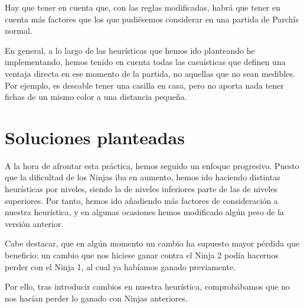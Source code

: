 \documentclass[10pt,a4paper]{article}
\begin{document}
Hay que tener en cuenta que, con las reglas modificadas, habrá que tener en cuenta más factores que los que pudiésemos considerar en una partida de Parchís normal.

En general, a lo largo de las heurísticas que hemos ido planteando he implementando, hemos tenido en cuenta todas las casuísticas que definen una ventaja directa en ese momento de la partida, no aquellas que no sean medibles. Por ejemplo, es deseable tener una casilla en casa, pero no aporta nada tener fichas de un mismo color a una distancia pequeña.

\section{Soluciones planteadas}
A la hora de afrontar esta práctica, hemos seguido un enfoque progresivo. Puesto que la dificultad de los Ninjas iba en aumento, hemos ido haciendo distintas heurísticas por niveles, siendo la de niveles inferiores parte de las de niveles superiores. Por tanto, hemos ido añadiendo más factores de consideración a nuestra heurística, y en algunas ocasiones hemos modificado algún peso de la versión anterior.

Cabe destacar, que en algún momento un cambio ha supuesto mayor pérdida que beneficio: un cambio que nos hiciese ganar contra el Ninja 2 podía hacernos perder con el Ninja 1, al cual ya habíamos ganado previamente. 

Por ello, tras introducir cambios en nuestra heurística, comprobábamos que no nos hacían perder lo ganado con Ninjas anteriores.
\end{document}

